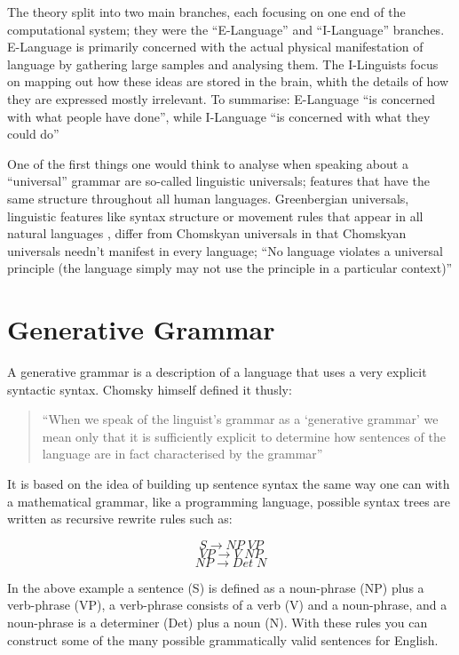 \documentclass[a4paper,10pt]{article}
\newcommand{\mli}[1]{\mathit{#1}}
\begin{document}
The theory split into two main branches, each focusing on one end of the computational system;
they were the ``E-Language'' and ``I-Language'' branches. E-Language is primarily concerned with
the actual physical manifestation of language by gathering large samples and analysing them. The
I-Linguists focus on mapping out how these ideas are stored in the brain, whith the details of
how they are expressed mostly irrelevant. To summarise: E-Language ``is concerned with what people
have done'', while I-Language ``is concerned with what they could do'' \citep[p.~14]{ChUGAI}

One of the first things one would think to analyse when speaking about a ``universal'' grammar
are so-called linguistic universals; features that have the same structure throughout all human
languages. Greenbergian universals, linguistic features like syntax structure or movement rules
that appear in all natural languages \citep{Greenberg473}, differ from Chomskyan universals in that
Chomskyan universals needn't manifest in every language; ``No language violates a universal principle
(the language simply may not use the principle in a particular context)'' \citep[p.~23]{ChUGAI}


\section{Generative Grammar}
A generative grammar is a description of a language that uses a very explicit syntactic syntax.
Chomsky himself defined it thusly:

\begin{quote}
	``When we speak of the linguist's grammar as a `generative grammar' we mean only that it is
	sufficiently explicit to determine how sentences of the language are in fact characterised
	by the grammar''
	
	\citep[p.~220]{Chomsky80}
\end{quote}

It is based on the idea of building up sentence syntax the same way one can with
a mathematical grammar, like a programming language, possible syntax trees are written as recursive
rewrite rules such as:

\[        S \rightarrow \mli{NP} \; \mli{VP} \]
\[ \mli{VP} \rightarrow V        \; \mli{NP} \]
\[ \mli{NP} \rightarrow Det      \; N        \]

In the above example a sentence (S) is defined as a noun-phrase (NP) plus a verb-phrase (VP),
a verb-phrase consists of a verb (V) and a noun-phrase, and a noun-phrase is a determiner (Det) plus
a noun (N). With these rules you can construct some of the many possible grammatically valid sentences
for English. \citep[p.~32]{ChUGAI}
\end{document}
